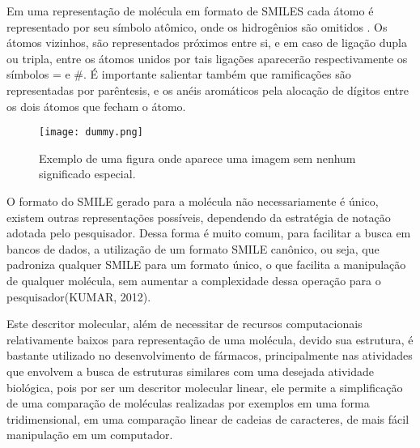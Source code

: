 Em uma representação de molécula em formato de SMILES cada átomo é representado por seu símbolo atômico, onde os hidrogênios são omitidos \cite{anderson1987smiles}. Os átomos vizinhos, são representados próximos entre si, e em caso de ligação dupla ou tripla, entre os átomos unidos por tais ligações aparecerão respectivamente os símbolos = e \#. É importante salientar também que ramificações são representadas por parêntesis, e os anéis aromáticos pela alocação de dígitos entre os dois átomos que fecham o átomo.

\begin{figure}[!htb]
	\centering
	\caption[Exemplo de uma figura]{Exemplo de uma figura onde aparece uma imagem sem nenhum significado especial.}
	\texttt{[image: dummy.png]} %
	\label{fig:dummy}
\end{figure}

O formato do SMILE gerado para a molécula não necessariamente é único, existem
outras representações possíveis, dependendo da estratégia de notação adotada pelo 
pesquisador. Dessa forma é muito comum, para facilitar a busca em bancos de dados, a 
utilização de um formato SMILE canônico, ou seja, que padroniza qualquer SMILE para um 
formato único, o que facilita a manipulação de qualquer molécula, sem aumentar a 
complexidade dessa operação para o pesquisador(KUMAR, 2012).

Este descritor molecular, além de necessitar de recursos computacionais relativamente 
baixos para representação de uma molécula, devido sua estrutura, é 
bastante utilizado no desenvolvimento de fármacos, principalmente nas atividades que 
envolvem a busca de estruturas similares com uma desejada atividade biológica, pois por ser 
um descritor molecular linear, ele permite a simplificação de uma comparação de moléculas 
realizadas por exemplos em uma forma tridimensional, em uma comparação linear de cadeias 
de caracteres, de mais fácil manipulação em um computador. 

